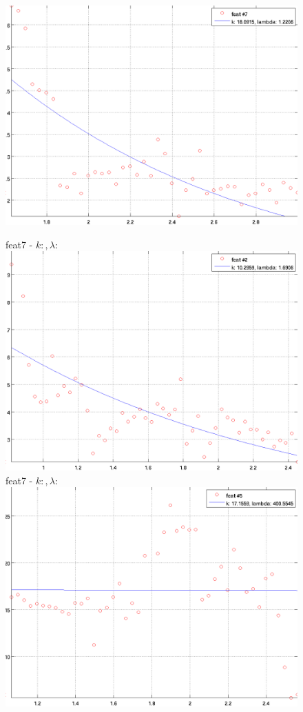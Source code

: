 \documentclass[12pt]{report}
\begin{document}
\begin{figure}
\begin{minipage}[t]{0.3\linewidth}
	\includegraphics[scale=\imFeatScale, angle=90]{images/feat7}
\end{minipage}
\begin{minipage}[t]{0.3\linewidth}
	\centering
	feat7 - $k: , \lambda:  $\\
	\includegraphics[scale=\imFeatScale, angle=90]{images/feat2}
	feat7 - $k: , \lambda:  $\\
	\includegraphics[scale=\imFeatScale, angle=90]{images/feat5}

\end{minipage}
\end{figure}
\end{document}
